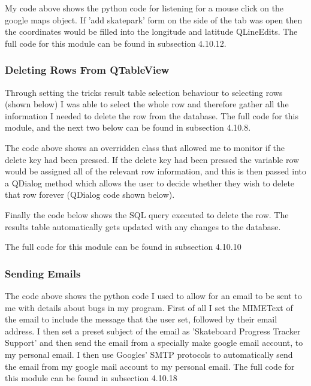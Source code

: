My code above shows the python code for listening for a mouse click on the google maps object. If 'add skatepark' form on the side of the tab was open then the coordinates would be filled into the longitude and latitude QLineEdits. The full code for this module can be found in subsection 4.10.12.



\subsubsection{Deleting Rows From QTableView}

Through setting the tricks result table selection behaviour to selecting rows (shown below) 
I was able to select the whole row and therefore gather all the information I needed to delete the row from the database. The full code for this module, and the next two below can be found in subsection 4.10.8.


The code above shows an overridden class that allowed me to monitor if the delete key had been pressed. If the delete key had been pressed the variable row would be assigned all of the relevant row information, and this is then passed into a QDialog method which allows the user to decide whether they wish to delete that row forever (QDialog code shown below). 


Finally the code below shows the SQL query executed to delete the row. The results table automatically gets updated with any changes to the database.


The full code for this module can be found in subsection  4.10.10




\subsubsection{Sending Emails}


The code above shows the python code I used to allow for an email to be sent to me with details about bugs in my program. First of all I set the MIMEText of the email to include the message that the user set, followed by their email address. I then set a preset subject of the email as 'Skateboard Progress Tracker Support' and then send the email from a specially make google email account, to my personal email. I then use Googles' SMTP protocols to automatically send the email from my google mail account to my personal email. The full code for this module can be found in subsection 4.10.18


